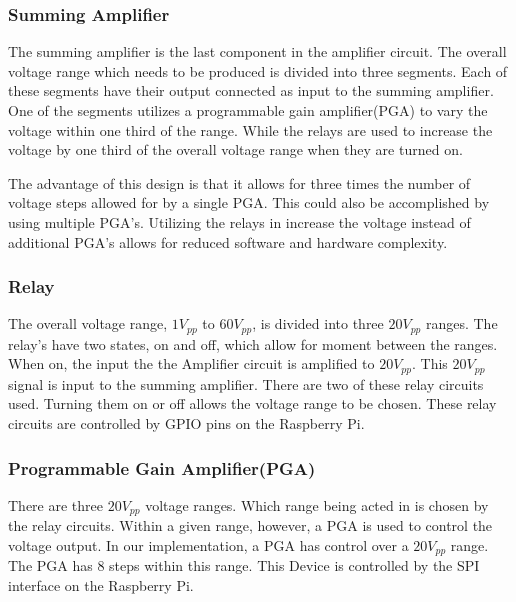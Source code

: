 \documentclass{article}	%
\begin{document}
\begin{multicols}{2}
\subsubsection{Summing Amplifier}
The summing amplifier is the last component
in the amplifier circuit.
The overall voltage range which needs to be produced is divided into three segments.
Each of these segments have their output connected as
input to the summing amplifier.
One of the segments utilizes a programmable gain amplifier(PGA)
to vary the voltage within one third of the range.
While the relays are used to increase the voltage by one third of the overall voltage range when they are turned on.

The advantage of this design is that
it allows for three times the number of voltage steps
allowed for by a single PGA.
This could also be accomplished by using multiple PGA's.
Utilizing the relays in increase the voltage instead of additional PGA's
allows for reduced software and hardware complexity.

\subsubsection{Relay}
The overall voltage range,
$1V_{pp}$ to $60V_{pp}$,
is divided into three $20V_{pp}$ ranges.
The relay's have two states,
on and off,
which allow for moment between the ranges.
When on,
the input the the Amplifier circuit is amplified to $20V_{pp}$.
This $20V_{pp}$ signal is input to the summing amplifier.
There are two of these relay circuits used.
Turning them on or off allows the voltage range to be chosen.
These relay circuits are controlled by 
GPIO pins on the Raspberry Pi.

\subsubsection{Programmable Gain Amplifier(PGA)}
There are three $20V_{pp}$ voltage ranges.
Which range being acted in is chosen by the relay circuits.
Within a given range,
however,
a PGA is used to control the voltage output.
In our implementation,
a PGA has control over a $20V_{pp}$ range.
The PGA has 8 steps within this range.
This Device is controlled by 
the SPI interface on the Raspberry Pi.




\end{multicols}
\end{document}
